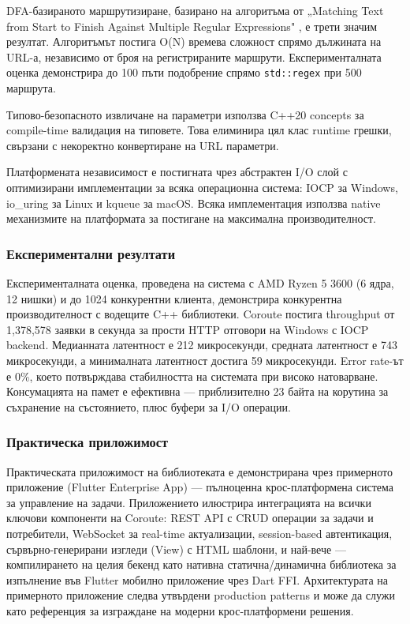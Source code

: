DFA-базираното маршрутизиране, базирано на алгоритъма от „Matching Text from Start to Finish Against Multiple Regular Expressions" \cite{stankov2024regex}, е трети значим резултат. Алгоритъмът постига O(N) времева сложност спрямо дължината на URL-а, независимо от броя на регистрираните маршрути. Експерименталната оценка демонстрира до 100 пъти подобрение спрямо \texttt{std::regex} при 500 маршрута.

Типово-безопасното извличане на параметри използва C++20 concepts за compile-time валидация на типовете. Това елиминира цял клас runtime грешки, свързани с некоректно конвертиране на URL параметри.

Платформената независимост е постигната чрез абстрактен I/O слой с оптимизирани имплементации за всяка операционна система: IOCP за Windows, io\_uring за Linux и kqueue за macOS. Всяка имплементация използва native механизмите на платформата за постигане на максимална производителност.

\subsubsection{Експериментални резултати}

Експерименталната оценка, проведена на система с AMD Ryzen 5 3600 (6 ядра, 12 нишки) и до 1024 конкурентни клиента, демонстрира конкурентна производителност с водещите C++ библиотеки. Coroute постига throughput от 1,378,578 заявки в секунда за прости HTTP отговори на Windows с IOCP backend. Медианната латентност е 212 микросекунди, средната латентност е 743 микросекунди, а минималната латентност достига 59 микросекунди. Error rate-ът е 0\%, което потвърждава стабилността на системата при високо натоварване. Консумацията на памет е ефективна --- приблизително 23 байта на корутина за съхранение на състоянието, плюс буфери за I/O операции.

\subsubsection{Практическа приложимост}

Практическата приложимост на библиотеката е демонстрирана чрез примерното приложение (Flutter Enterprise App) --- пълноценна крос-платформена система за управление на задачи. Приложението илюстрира интеграцията на всички ключови компоненти на Coroute: REST API с CRUD операции за задачи и потребители, WebSocket за real-time актуализации, session-based автентикация, сървърно-генерирани изгледи (View) с HTML шаблони, и най-вече --- компилирането на целия бекенд като нативна статична/динамична библиотека за изпълнение във Flutter мобилно приложение чрез Dart FFI. Архитектурата на примерното приложение следва утвърдени production patterns и може да служи като референция за изграждане на модерни крос-платформени решения.

